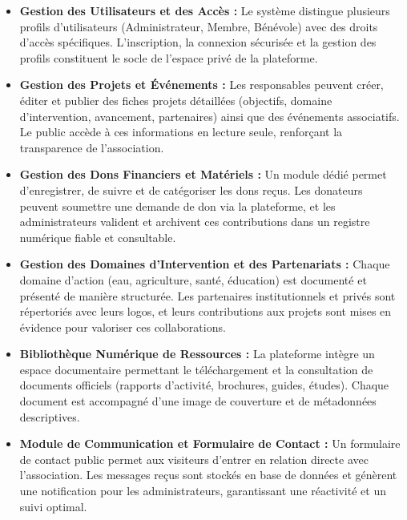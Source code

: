 \documentclass[12pt,a4paper,twoside,openright]{report}
\begin{document}
\begin{itemize}[label=\textcolor{primaryBlue}{$\bullet$}, leftmargin=1.5cm, itemsep=0.35cm]

    \item \textbf{Gestion des Utilisateurs et des Accès :}
    Le système distingue plusieurs profils d'utilisateurs (Administrateur, Membre, Bénévole) avec des droits d'accès spécifiques. L'inscription, la connexion sécurisée et la gestion des profils constituent le socle de l'espace privé de la plateforme.

    \item \textbf{Gestion des Projets et Événements :}
    Les responsables peuvent créer, éditer et publier des fiches projets détaillées (objectifs, domaine d'intervention, avancement, partenaires) ainsi que des événements associatifs. Le public accède à ces informations en lecture seule, renforçant la transparence de l'association.

    \item \textbf{Gestion des Dons Financiers et Matériels :}
    Un module dédié permet d'enregistrer, de suivre et de catégoriser les dons reçus. Les donateurs peuvent soumettre une demande de don via la plateforme, et les administrateurs valident et archivent ces contributions dans un registre numérique fiable et consultable.

    \item \textbf{Gestion des Domaines d'Intervention et des Partenariats :}
    Chaque domaine d'action (eau, agriculture, santé, éducation) est documenté et présenté de manière structurée. Les partenaires institutionnels et privés sont répertoriés avec leurs logos, et leurs contributions aux projets sont mises en évidence pour valoriser ces collaborations.

    \item \textbf{Bibliothèque Numérique de Ressources :}
    La plateforme intègre un espace documentaire permettant le téléchargement et la consultation de documents officiels (rapports d'activité, brochures, guides, études). Chaque document est accompagné d'une image de couverture et de métadonnées descriptives.

    \item \textbf{Module de Communication et Formulaire de Contact :}
    Un formulaire de contact public permet aux visiteurs d'entrer en relation directe avec l'association. Les messages reçus sont stockés en base de données et génèrent une notification pour les administrateurs, garantissant une réactivité et un suivi optimal.


\end{itemize}
\end{document}
